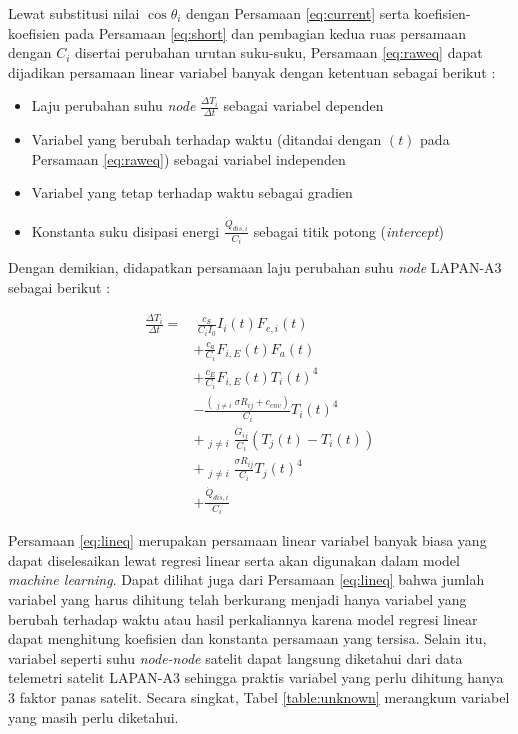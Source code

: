 Lewat substitusi nilai $\cos{\theta_i}$ dengan Persamaan \ref{eq:current} serta
koefisien-koefisien pada Persamaan \ref{eq:short} dan pembagian kedua ruas
persamaan dengan $C_i$ disertai perubahan urutan suku-suku,
Persamaan \ref{eq:raweq} dapat dijadikan persamaan linear variabel banyak
dengan ketentuan sebagai berikut :

\begin{itemize}
	\item Laju perubahan suhu \textit{node} $\frac{\Delta T_i}{\Delta t}$ sebagai variabel dependen
	\item Variabel yang berubah terhadap waktu (ditandai dengan $(t)$ pada Persamaan \ref{eq:raweq}) sebagai variabel independen
	\item Variabel yang tetap terhadap waktu sebagai gradien
	\item Konstanta suku disipasi energi $\frac{\dot{Q}_{dis,i}}{C_i}$ sebagai titik potong (\textit{intercept})
\end{itemize}

Dengan demikian, didapatkan persamaan laju perubahan suhu \textit{node} LAPAN-A3 sebagai berikut :

\begin{equation}
\label{eq:lineq}
\begin{split}
	\frac{\Delta T_i}{\Delta t} = &\ \frac{c_S}{C_i I_0} I_{i}(t) F_{e,i}(t) \\
	&+ \frac{c_a}{C_i} F_{i,E}(t) F_a(t) \\
	&+ \frac{c_E}{C_i} F_{i,E}(t) T_{i}(t)^4 \\
	&- \frac{\left( \mathop{\sum_{j=1}^{N}}_{j \neq i} \sigma R_{ij} + c_{env} \right) }{C_i} T_{i}(t)^4 \\
	&+ \mathop{\sum_{j=1}^{N}}_{j \neq i} \frac{G_{ij}}{C_i} \left(T_j(t) - T_i(t)\right) \\
	&+ \mathop{\sum_{j=1}^{N}}_{j \neq i} \frac{\sigma R_{ij}}{C_i}T_{j}(t)^4 \\
	&+ \frac{\dot{Q}_{dis,i}}{C_i}
\end{split}
\end{equation}

Persamaan \ref{eq:lineq} merupakan persamaan linear variabel banyak biasa yang
dapat diselesaikan lewat regresi linear serta akan digunakan dalam model
\textit{machine learning}. Dapat dilihat juga dari Persamaan \ref{eq:lineq} bahwa jumlah
variabel yang harus dihitung telah berkurang menjadi hanya variabel yang
berubah terhadap waktu atau hasil perkaliannya karena model regresi linear
dapat menghitung koefisien dan konstanta persamaan yang tersisa. Selain itu,
variabel seperti suhu \textit{node-node} satelit dapat langsung diketahui dari data
telemetri satelit LAPAN-A3 sehingga praktis variabel yang perlu dihitung hanya
3 faktor panas satelit. Secara singkat, Tabel \ref{table:unknown} merangkum
variabel yang masih perlu diketahui.

